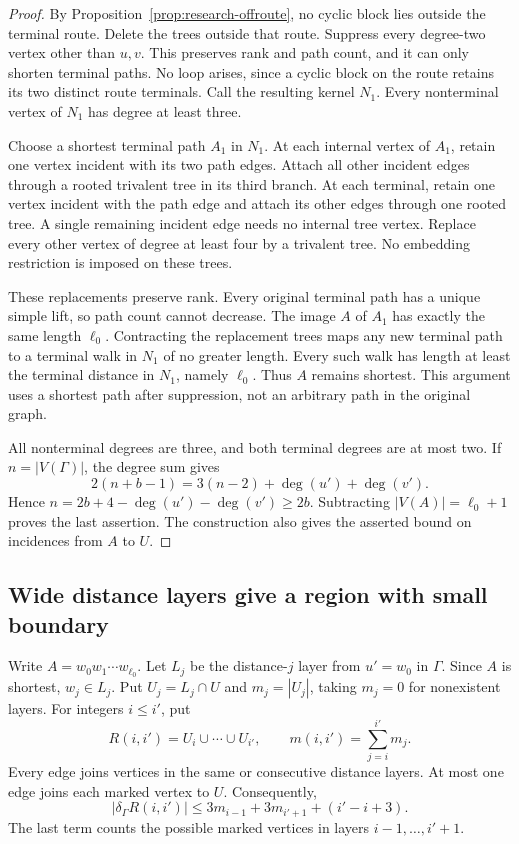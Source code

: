 \begin{proof}
By Proposition~\ref{prop:research-offroute}, no cyclic block lies outside the terminal route.
Delete the trees outside that route.
Suppress every degree-two vertex other than $u,v$.
This preserves rank and path count, and it can only shorten terminal paths.
No loop arises, since a cyclic block on the route retains its two distinct route terminals.
Call the resulting kernel $N_1$.
Every nonterminal vertex of $N_1$ has degree at least three.

Choose a shortest terminal path $A_1$ in $N_1$.
At each internal vertex of $A_1$, retain one vertex incident with its two path edges.
Attach all other incident edges through a rooted trivalent tree in its third branch.
At each terminal, retain one vertex incident with the path edge and attach its other edges through one rooted tree.
A single remaining incident edge needs no internal tree vertex.
Replace every other vertex of degree at least four by a trivalent tree.
No embedding restriction is imposed on these trees.

These replacements preserve rank.
Every original terminal path has a unique simple lift, so path count cannot decrease.
The image $A$ of $A_1$ has exactly the same length $\ell_0$.
Contracting the replacement trees maps any new terminal path to a terminal walk in $N_1$ of no greater length.
Every such walk has length at least the terminal distance in $N_1$, namely $\ell_0$.
Thus $A$ remains shortest.
This argument uses a shortest path after suppression, not an arbitrary path in the original graph.

All nonterminal degrees are three, and both terminal degrees are at most two.
If $n=|V(\Gamma)|$, the degree sum gives
\[
 2(n+b-1)=3(n-2)+\deg(u')+\deg(v').
\]
Hence $n=2b+4-\deg(u')-\deg(v')\ge2b$.
Subtracting $|V(A)|=\ell_0+1$ proves the last assertion.
The construction also gives the asserted bound on incidences from $A$ to $U$.
\end{proof}

\subsection{Wide distance layers give a region with small boundary}

Write $A=w_0w_1\cdots w_{\ell_0}$.
Let $L_j$ be the distance-$j$ layer from $u'=w_0$ in $\Gamma$.
Since $A$ is shortest, $w_j\in L_j$.
Put $U_j=L_j\cap U$ and $m_j=|U_j|$, taking $m_j=0$ for nonexistent layers.
For integers $i\le i'$, put
\[
 R(i,i')=U_i\cup\cdots\cup U_{i'},\qquad
 m(i,i')=\sum_{j=i}^{i'}m_j.
\]
Every edge joins vertices in the same or consecutive distance layers.
At most one edge joins each marked vertex to $U$.
Consequently,
\begin{equation}\label{eq:general-window-boundary}
 |\delta_\Gamma R(i,i')|
 \le3m_{i-1}+3m_{i'+1}+(i'-i+3).
\end{equation}
The last term counts the possible marked vertices in layers $i-1,\ldots,i'+1$.

